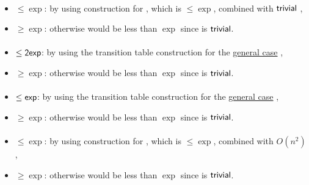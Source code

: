 \paragraph{\ODLA{}\tto\TDFA}\label{cost:1DLAto2DFAu}
\begin{itemize}
	\item $\le\exp$: by using construction for \hyperref[cost:1DLAto1DFAu]{\ODLA{}\tto\ODFA}, which is $\le\exp$, combined with $\mathsf{trivial}$ \ODFA{}\tto\TDFA,
	\item $\ge\exp$: otherwise \hyperref[cost:1DLAto2NFAu]{\ODLA{}\tto\TNFA} would be less than $\exp$ since \TDFA{}\tto\TNFA is $\mathsf{trivial}$.
\end{itemize}
\paragraph{\OLA{}\tto\ODFA}
\begin{itemize}
	\item $\le\mathsf{2exp}$: by using the transition table construction for the \hyperref[cost:1LAto1DFA]{general case} \cite{PigPis14},
	\item $\ge\exp$: otherwise \hyperref[cost:1DLAto1DFAu]{\ODLA{}\tto\ODFA} would be less than $\exp$ since \ODLA{}\tto\OLA is $\mathsf{trivial}$.
\end{itemize}
\paragraph{\OLA{}\tto\ONFA}\label{cost:1DLAto1NFAu}
\begin{itemize}
	\item $\le\mathsf{exp}$: by using the transition table construction for the \hyperref[cost:1LAto1NFA]{general case} \cite{PigPis14},
	\item $\ge\exp$: otherwise \hyperref[cost:1DLAto1NFAu]{\ODLA{}\tto\ONFA} would be less than $\exp$ since \ODLA{}\tto\OLA is $\mathsf{trivial}$.
\end{itemize}
\paragraph{\OLA{}\tto\TDFA}
\begin{itemize}
	\item $\le\exp$: by using construction for \hyperref[cost:1LAto1NFAu]{\OLA{}\tto\ONFA}, which is $\le\exp$, combined with $O(n^2)$ \hyperref[cost:1NFAto2DFAu]{\ONFA{}\tto\TDFA},
	\item $\ge\exp$: otherwise \hyperref[cost:1DLAto2DFAu]{\ODLA{}\tto\TDFA} would be less than $\exp$ since \ODLA{}\tto\OLA is $\mathsf{trivial}$.
\end{itemize}
